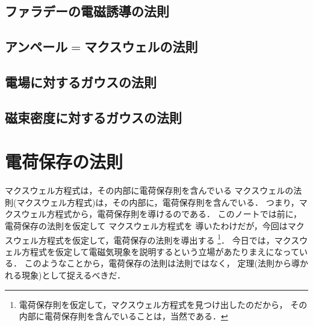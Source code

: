         \subsection{ファラデーの電磁誘導の法則}

        \subsection{アンペール$=$マクスウェルの法則}

        \subsection{電場に対するガウスの法則}

        \subsection{磁束密度に対するガウスの法則}

    \section{電荷保存の法則}
    \begin{mysmallsec}{マクスウェル方程式は，その内部に電荷保存則を含んでいる}
        マクスウェルの法則(マクスウェル方程式)は，その内部に，電荷保存則を含んでいる．
        つまり，マクスウェル方程式から，電荷保存則を導けるのである．
        このノートでは前に，電荷保存の法則を仮定して マクスウェル方程式を
        導いたわけだが，今回はマクスウェル方程式を仮定して，電荷保存の法則を導出する
            \footnote{
                電荷保存則を仮定して，マクスウェル方程式を見つけ出したのだから，
                その内部に電荷保存則を含んでいることは，当然である．
            }．
        今日では，マクスウェル方程式を仮定して電磁気現象を説明するという立場があたりまえになっている．
        このようなことから，電荷保存の法則は法則ではなく，
        定理(法則から導かれる現象)として捉えるべきだ．
    \end{mysmallsec}

